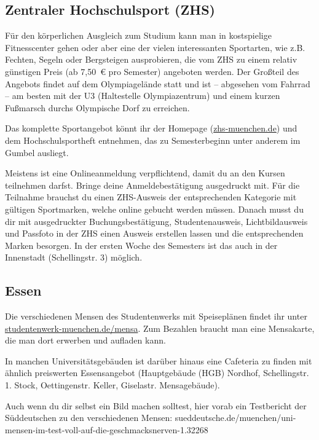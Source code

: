 \documentclass[twoside,12pt,parskip=half-]{scrartcl}
\begin{document}
\clearpage


\subsection{Zentraler Hochschulsport (ZHS)}
Für den körperlichen Ausgleich zum Studium kann man in kostspielige Fitnesscenter gehen oder aber eine der vielen interessanten Sportarten, wie z.B. Fechten, Segeln oder Bergsteigen ausprobieren, die vom ZHS zu einem relativ günstigen Preis (ab 7,50~€ pro Semester) angeboten werden. Der Großteil des Angebots findet auf dem Olympiagelände statt und ist -- abgesehen vom Fahrrad -- am besten mit der U3 (Haltestelle Olympiazentrum) und einem kurzen Fußmarsch durchs Olympische Dorf zu erreichen.

Das komplette Sportangebot könnt ihr der Homepage (\url{zhs-muenchen.de}) und dem Hochschulsportheft entnehmen, das zu Semesterbeginn unter anderem im Gumbel ausliegt.

Meistens ist eine Onlineanmeldung verpflichtend, damit du an den
Kursen teilnehmen darfst. Bringe deine Anmeldebestätigung ausgedruckt
mit. Für die Teilnahme brauchst du einen ZHS-Ausweis der
entsprechenden Kategorie mit gültigen Sportmarken, welche online
gebucht werden müssen. Danach musst du dir mit ausgedruckter
Buchungsbestätigung, Studentenausweis, Lichtbildausweis und Passfoto
in der ZHS einen Ausweis erstellen lassen und die entsprechenden
Marken besorgen. In der ersten Woche des Semesters ist das auch in der
Innenstadt (Schellingstr. 3) möglich.



\subsection{Essen}

Die verschiedenen Mensen des Studentenwerks mit Speiseplänen findet ihr unter\\ \url{studentenwerk-muenchen.de/mensa}. Zum Bezahlen braucht man eine Mensakarte, die man dort erwerben und aufladen kann.

In manchen Universitätsgebäuden ist darüber hinaus eine Cafeteria zu finden mit ähnlich preiswerten Essensangebot (Hauptgebäude (HGB) Nordhof, Schellingstr. 1. Stock, Oettingenstr. Keller, Giselastr. Mensagebäude).

Auch wenn du dir selbst ein Bild machen solltest, hier vorab ein Testbericht der Süddeutschen zu den verschiedenen Mensen:
sueddeutsche.de/muenchen/uni-mensen-im-test-\newline voll-auf-die-geschmacksnerven-1.32268
\end{document}
